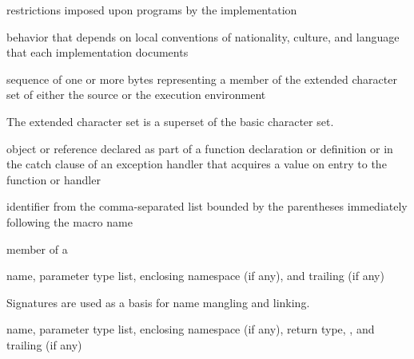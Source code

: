 %
restrictions imposed upon programs by the implementation

%
behavior that depends on local conventions of nationality, culture, and
language that each implementation documents

%
sequence of one or more bytes representing a member of the extended
character set of either the source or the execution environment

\begin{defnote}
The extended character set is a superset of the basic character
set.
\end{defnote}

%
%
%
 object or reference declared as part of a function declaration or
definition or in the catch clause of an exception handler that
acquires a value on entry to the function or handler

%
%
 identifier from
the comma-separated list bounded by the parentheses immediately
following the macro name

%
%
 member of a 

%
name,
parameter type list,
enclosing namespace (if any),
and
trailing  (if any)

\begin{defnote}
Signatures are used as a basis for
name mangling and linking.
\end{defnote}

%
name,
parameter type list,
enclosing namespace (if any),
return type,
,
and
trailing  (if any)

